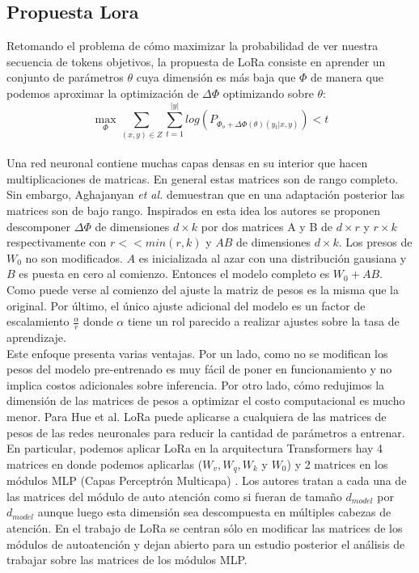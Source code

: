 \documentclass{book}
\begin{document}
\subsection{Propuesta Lora}
Retomando el problema de cómo maximizar la probabilidad de ver nuestra secuencia de tokens objetivos, la propuesta de LoRa consiste en aprender un conjunto de parámetros $\theta$ cuya dimensión es más baja que $\Phi$ de manera que podemos aproximar la optimización de $\Delta \Phi$ optimizando sobre $\theta$:
$$\max_{\Phi} \sum_{(x,y)\in Z} \sum_{t=1}^{|y|} log (P_{\Phi_o+\Delta\Phi(\theta)(y_t|x,y)})<t$$ \\


%
Una red neuronal contiene muchas capas densas en su interior que hacen multiplicaciones de matricas. En general estas matrices son de rango completo. Sin embargo, Aghajanyan \textit{et al.} demuestran que en una adaptación posterior las matrices son de bajo rango. Inspirados en esta idea los autores se proponen descomponer $\Delta \Phi$ de dimensiones $d \times k$ por dos matrices A y B de $d \times r$ y $r\times k$ respectivamente con $r << min(r,k)$ y $AB$ de dimensiones $d\times k $. Los presos de $W_0$ no son modificados. $A$ es inicializada al azar con una distribución gausiana y $B$ es puesta en cero al comienzo. Entonces el modelo completo es $W_0 + AB$.  Como puede verse al comienzo del ajuste la matriz de pesos es la misma que la original. Por último, el único ajuste adicional del modelo es un factor de escalamiento $\frac{\alpha}{r}$ donde $\alpha$ tiene un rol parecido a realizar ajustes sobre la tasa de aprendizaje. \cite{hu2021lora} \\

Este enfoque presenta varias ventajas. Por un lado, como no se modifican los pesos del modelo pre-entrenado es muy fácil de poner en funcionamiento y no implica costos adicionales sobre inferencia. Por otro lado, cómo redujimos la dimensión de las matrices de pesos a optimizar el costo computacional es mucho menor.
Para Hue et al. LoRa puede aplicarse a cualquiera de las matrices de pesos de las redes neuronales para reducir la cantidad de parámetros a entrenar. En particular, podemos aplicar LoRa en la arquitectura Transformers hay 4 matrices en donde podemos aplicarlas ($W_v,W_q, W_k$  y $W_0$) y 2 matrices en los módulos MLP (Capas Perceptrón Multicapa) . Los autores tratan a cada una de las matrices del módulo de auto atención como si fueran de tamaño $d_{model}$ por $ d_{model}$ aunque luego esta dimensión sea descompuesta en múltiples cabezas de atención. En el trabajo de LoRa se centran sólo en modificar las matrices de los módulos de autoatención y dejan abierto para un estudio posterior el análisis de trabajar sobre las matrices de los módulos MLP.\\
\end{document}
